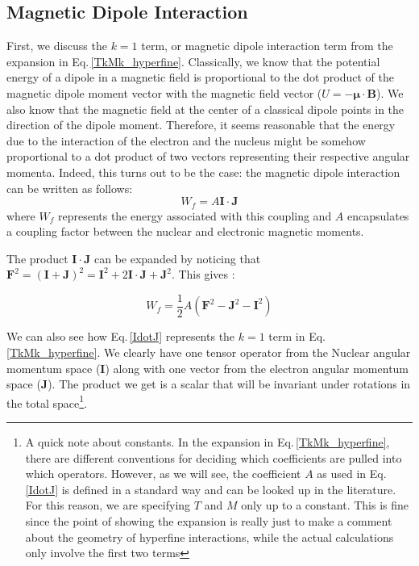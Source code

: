\subsection{Magnetic Dipole Interaction}

First, we discuss the $k=1$ term, or magnetic dipole interaction term from the expansion in Eq.\,\ref{TkMk_hyperfine}. Classically, we know that the potential energy of a dipole in a magnetic field is proportional to the dot product of the magnetic dipole moment vector with the magnetic field vector ($U=-\mathbf{\mu}\cdot\mathbf{B}$). We also know that the magnetic field at the center of a classical dipole points in the direction of the dipole moment. Therefore, it seems reasonable that the energy due to the interaction of the electron and the nucleus might be somehow proportional to a dot product of two vectors representing their respective angular momenta. Indeed, this turns out to be the case: the magnetic dipole interaction can be written as follows\cite{sobelman_spectra}: 
\begin{equation}\label{IdotJ}
W_f=A\mathbf{I}\cdot\mathbf{J}
\end{equation}
where $W_f$ represents the energy associated with this coupling and $A$ encapsulates a coupling factor between the nuclear and electronic magnetic moments. 

The product $\mathbf{I}\cdot\mathbf{J}$ can be expanded by noticing that $\mathbf{F}^2=(\mathbf{I}+\mathbf{J})^2=\mathbf{I}^2+2 \mathbf{I}\cdot\mathbf{J}+\mathbf{J}^2$. This gives \cite{cuaMITnotes}\cite{sobelman_spectra}: 

\begin{equation}\label{Wf_dot_product}
W_f=\frac{1}{2}A(\mathbf{F}^2-\mathbf{J}^2-\mathbf{I}^2)
\end{equation}

We can also see how Eq.\,\ref{IdotJ} represents the $k=1$ term in Eq.\,\ref{TkMk_hyperfine}. We clearly have one tensor operator from the Nuclear angular momentum space ($\mathbf{I}$) along with one vector from the electron angular momentum space ($\mathbf{J}$). The product we get is a scalar that will be invariant under rotations in the total space\footnote{A quick note about constants. In the expansion in Eq.\,\ref{TkMk_hyperfine}, there are different conventions \cite{schwartz_hyperfine_expansion} for deciding which coefficients are pulled into which operators. However, as we will see, the coefficient $A$ as used in Eq.\,\ref{IdotJ} is defined in a standard way and can be looked up in the literature. For this reason, we are specifying $T$ and $M$ only up to a constant. This is fine since the point of showing the expansion is really just to make a comment about the geometry of hyperfine interactions, while the actual calculations only involve the first two terms}.

